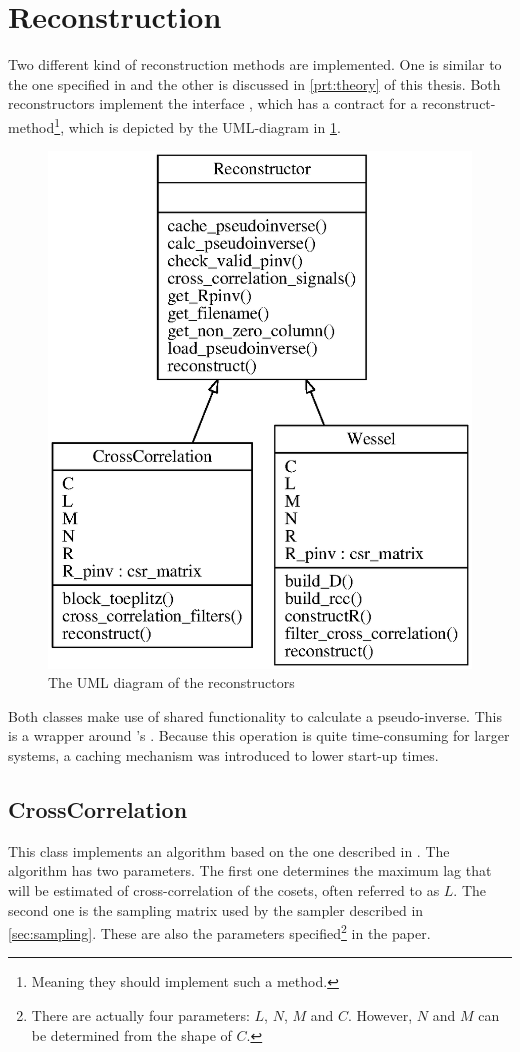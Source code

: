 \documentclass[a4paper, openany, oneside]{memoir}
\begin{document}
\section{Reconstruction}
\label{sec:reconstruction}
Two different kind of reconstruction methods are implemented. One is similar to the one specified in \cite{ariananda2012compressive} and the other is discussed in \cref{prt:theory} of this thesis. Both reconstructors implement the interface , which has a contract for a reconstruct-method\footnote{Meaning they should implement such a method.}, which is depicted by the UML-diagram in \cref{fig:umlreconstructor}.

\begin{figure}[h]
    \centering
    \includegraphics[width=0.5\linewidth]{./figures/classes_reconstruction.eps}
    \caption{The UML diagram of the reconstructors}
    \label{fig:umlreconstructor}
\end{figure}

Both classes make use of shared functionality to calculate a pseudo-inverse. This is a wrapper around 's . Because this operation is quite time-consuming for larger systems, a caching mechanism was introduced to lower start-up times.

\subsection{CrossCorrelation}
\label{sub:crosscorrelation}
This class implements an algorithm based on the one described in \cite{ariananda2012compressive}. The algorithm has two parameters. The first one determines the maximum lag that will be estimated of cross-correlation of the cosets, often referred to as $L$. The second one is the sampling matrix used by the sampler described in \cref{sec:sampling}. These are also the parameters specified\footnote{\label{fn:reconparam}There are actually four parameters: $L$, $N$, $M$ and $C$. However, $N$ and $M$ can be determined from the shape of $C$.} in the paper.
\end{document}

